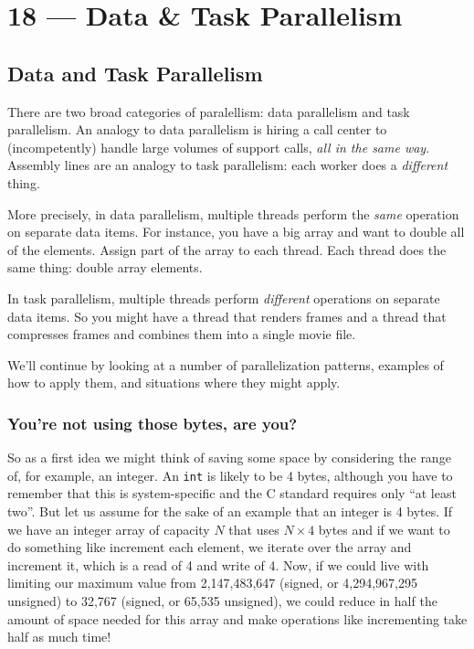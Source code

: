 \documentclass[a4paper]{report}
\begin{document}
\chapter*{18 --- Data \& Task Parallelism}



\section*{Data and Task Parallelism}
There are two broad categories of paralellism: data parallelism and
task parallelism. An analogy to data parallelism is hiring a call
center to (incompetently) handle large volumes of support calls,
\emph{all in the same way}. Assembly lines are an analogy to task
parallelism: each worker does a \emph{different} thing.

More precisely, in data parallelism, multiple threads perform the
\emph{same} operation on separate data items. For instance, you have a
big array and want to double all of the elements. Assign part of the
array to each thread. Each thread does the same thing: double array
elements.

In task parallelism, multiple threads perform \emph{different}
operations on separate data items. So you might have a thread that
renders frames and a thread that compresses frames and combines them
into a single movie file.

We'll continue by looking at a number of parallelization patterns,
examples of how to apply them, and situations where they might apply.

\subsection*{You're not using those bytes, are you?}
So as a first idea we might think of saving some space by considering the range of, for example, an integer. An \texttt{int} is likely to be 4 bytes, although you have to remember that this is system-specific and the C standard requires only ``at least two''. But let us assume for the sake of an example that an integer is 4 bytes. If we have an integer array of capacity $N$ that uses $N \times 4$ bytes and if we want to do something like increment each element, we iterate over the array and increment it, which is a read of 4 and write of 4. Now, if we could live with limiting our maximum value from 2,147,483,647 (signed, or 4,294,967,295 unsigned) to 32,767  (signed, or 65,535 unsigned), we could reduce in half the amount of space needed for this array and make operations like incrementing take half as much time!
\end{document}

